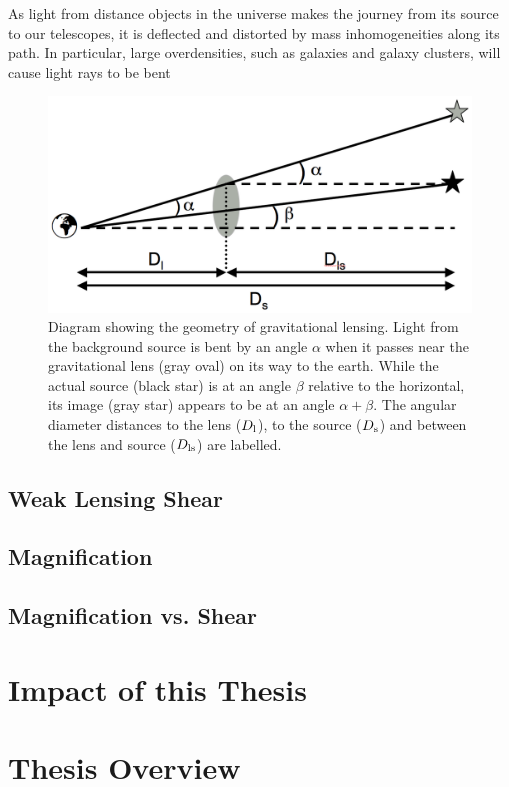 As light from distance objects in the universe makes the journey from its source to our telescopes, it is deflected and distorted by mass inhomogeneities along its path. In particular, large overdensities, such as galaxies and galaxy clusters, will cause light rays to be bent 

\begin{figure}
\begin{center}
\includegraphics[scale=0.3]{plots_intro/LensDiagram.png}
\caption[Gravitational Lensing Diagram]{Diagram showing the geometry of gravitational lensing. Light from the background source is bent by an angle $\alpha$ when it passes near the gravitational lens (gray oval) on its way to the earth. While the actual source (black star) is at an angle $\beta$ relative to the horizontal, its image (gray star) appears to be at an angle $\alpha+\beta$. The angular diameter distances to the lens ($D_{\rm l}$), to the source ($D_{\rm s}$) and between the lens and source ($D_{\rm ls}$) are labelled.}
\label{lensing}
\end{center}
\end{figure}


\subsection{Weak Lensing Shear}

\subsection{Magnification}

\subsection{Magnification vs. Shear}

\section{Impact of this Thesis}
\label{sec:impact}


\section{Thesis Overview}
\label{sec:overview}


\endinput
Any text after an \endinput is ignored.
You could put scraps here or things in progress.
